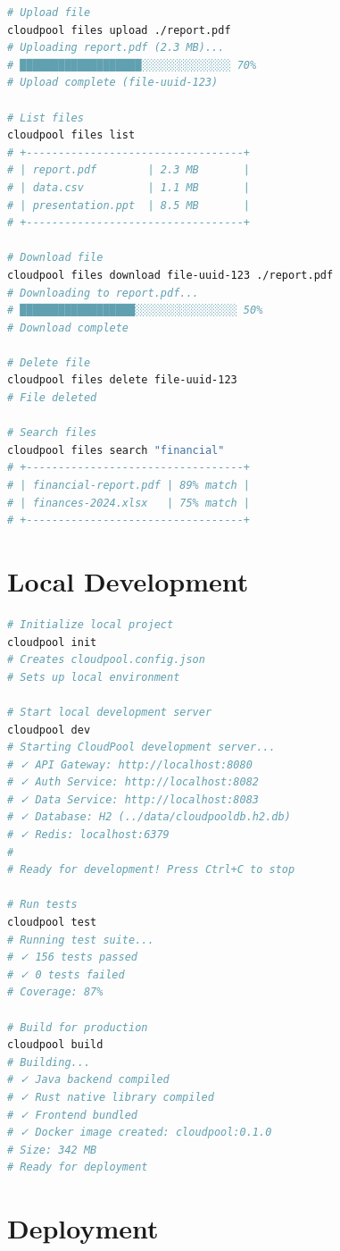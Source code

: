 \documentclass[11pt,a4paper]{report}
\begin{document}
\begin{lstlisting}[language=bash]
# Upload file
cloudpool files upload ./report.pdf
# Uploading report.pdf (2.3 MB)...
# ███████████████████░░░░░░░░░░░░░░ 70%
# Upload complete (file-uuid-123)

# List files
cloudpool files list
# +----------------------------------+
# | report.pdf        | 2.3 MB       |
# | data.csv          | 1.1 MB       |
# | presentation.ppt  | 8.5 MB       |
# +----------------------------------+

# Download file
cloudpool files download file-uuid-123 ./report.pdf
# Downloading to report.pdf...
# ██████████████████░░░░░░░░░░░░░░░░ 50%
# Download complete

# Delete file
cloudpool files delete file-uuid-123
# File deleted

# Search files
cloudpool files search "financial"
# +----------------------------------+
# | financial-report.pdf | 89% match |
# | finances-2024.xlsx   | 75% match |
# +----------------------------------+
\end{lstlisting}


\section{Local Development}


\begin{lstlisting}[language=bash]
# Initialize local project
cloudpool init
# Creates cloudpool.config.json
# Sets up local environment

# Start local development server
cloudpool dev
# Starting CloudPool development server...
# ✓ API Gateway: http://localhost:8080
# ✓ Auth Service: http://localhost:8082
# ✓ Data Service: http://localhost:8083
# ✓ Database: H2 (../data/cloudpooldb.h2.db)
# ✓ Redis: localhost:6379
# 
# Ready for development! Press Ctrl+C to stop

# Run tests
cloudpool test
# Running test suite...
# ✓ 156 tests passed
# ✓ 0 tests failed
# Coverage: 87%

# Build for production
cloudpool build
# Building...
# ✓ Java backend compiled
# ✓ Rust native library compiled
# ✓ Frontend bundled
# ✓ Docker image created: cloudpool:0.1.0
# Size: 342 MB
# Ready for deployment
\end{lstlisting}


\section{Deployment}
\end{document}
